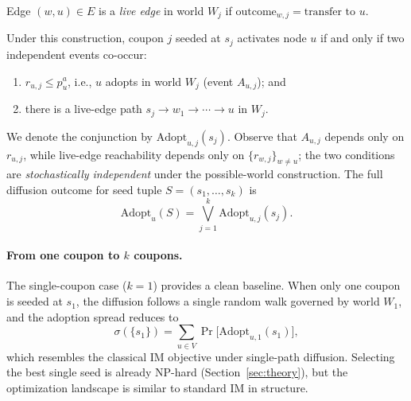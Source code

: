 \documentclass[sigconf]{acmart}
\begin{document}
\begin{definition}
Edge $(w,u) \in E$ is a \emph{live edge} in world $W_j$ if\/
$\mathrm{outcome}_{w,j} = \text{transfer to }u$.
\end{definition}

Under this construction, coupon $j$ seeded at $s_j$ activates node $u$
if and only if two independent events co-occur:
\begin{enumerate}[label=(\roman*)]
  \item $r_{u,j} \leq p_u^a$, i.e., $u$ adopts in world $W_j$
    (event $A_{u,j}$); and
  \item there is a live-edge path $s_j \to w_1 \to \cdots \to u$ in
    $W_j$.
\end{enumerate}
We denote the conjunction by $\mathrm{Adopt}_{u,j}(s_j)$.
Observe that $A_{u,j}$ depends only on $r_{u,j}$, while live-edge
reachability depends only on $\{r_{w,j}\}_{w \neq u}$; the two
conditions are \emph{stochastically independent} under the
possible-world construction.
The full diffusion outcome for seed tuple $S = (s_1,\ldots,s_k)$ is
\[
  \mathrm{Adopt}_u(S) = \bigvee_{j=1}^{k} \mathrm{Adopt}_{u,j}(s_j).
\]

\paragraph{From one coupon to $k$ coupons.}
The single-coupon case ($k=1$) provides a clean baseline.
When only one coupon is seeded at $s_1$, the diffusion follows a
single random walk governed by world $W_1$, and the adoption spread
reduces to
\[
  \sigma(\{s_1\}) = \sum_{u \in V} \Pr\bigl[\mathrm{Adopt}_{u,1}(s_1)\bigr],
\]
which resembles the classical IM objective under single-path diffusion.
Selecting the best single seed is already NP-hard
(Section~\ref{sec:theory}), but the optimization landscape is similar
to standard IM in structure.
\end{document}
